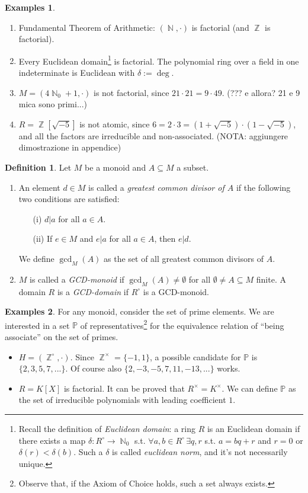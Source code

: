 \documentclass[12pt,a4paper]{report}
\theoremstyle{definition}
\newtheorem{defn}[theorem]{Definition}
\newtheorem*{examples}{Examples}
\theoremstyle{num.custom-title}
\DeclareMathOperator{\N}{\mathbb{N}}
\DeclareMathOperator{\Z}{\mathbb{Z}}
\DeclareMathOperator{\sse}{\subseteq}
\renewcommand{\P}{\mathbb{P}}
\begin{document}
\begin{examples}\ 
\begin{enumerate}
\item Fundamental Theorem of Arithmetic: $(\N,\cdot)$ is factorial (and $\Z$ is factorial).
\item Every Euclidean domain\footnote{Recall the definition of \emph{Euclidean domain}: a ring $R$ is an Euclidean domain if there exists a map $\delta : R^\circ \to \N_0$ s.t. $\forall a,b \in R^\circ \, \exists q,r$ s.t. $a=bq+r$ and $r=0$ or $\delta(r) < \delta(b)$. Such a $\delta$ is called \emph{euclidean norm}, and it's not necessarily unique.} is factorial. The polynomial ring over a field in one indeterminate is Euclidean with $\delta:=\deg$.
\item $M=(4\N_0+1,\cdot)$ is not factorial, since $21 \cdot 21 = 9 \cdot 49$. (??? e allora? 21 e 9 mica sono primi...)
\item $R=\Z[\sqrt{-5}]$ is not atomic, since $6 = 2 \cdot 3 = (1+\sqrt{-5}) \cdot (1-\sqrt{-5})$, and all the factors are irreducible and non-associated. (NOTA: aggiungere dimostrazione in appendice)
\end{enumerate}
\end{examples}

\begin{defn}
Let $M$ be a monoid and $A \sse M$ a subset.
\begin{enumerate}
\item An element $d \in M$ is called a \emph{greatest common divisor of $A$} if the following two conditions are satisfied:
\begin{enumerate}
\item[(i)] $d|a$ for all $a \in A$.
\item[(ii)] If $e \in M$ and $e|a$ for all $a \in A$, then $e|d$.
\end{enumerate}
We define $\gcd_M (A)$ as the set of all greatest common divisors of $A$.
\item $M$ is called a \emph{GCD-monoid} if $\gcd_M (A) \neq \emptyset$ for all $\emptyset \neq A \sse M$ finite. A domain $R$ is a \emph{GCD-domain} if $R^\circ$ is a GCD-monoid.
\end{enumerate}
\end{defn}

\begin{examples}
For any monoid, consider the set of prime elements. We are interested in a set $\P$ of representatives\footnote{Observe that, if the Axiom of Choice holds, such a set always exists.} for the equivalence relation of ``being associate'' on the set of primes.
\begin{itemize}
\item $H=(\Z^\circ,\cdot)$. Since $\Z^\times=\{-1,1\}$, a possible candidate for $\P$ is $\{2,3,5,7,...\}$. Of course also $\{2,-3,-5,7,11,-13,...\}$ works.
\item $R=K[X]$ is factorial. It can be proved that $R^\times=K^\times$. We can define $\P$ as the set of irreducible polynomials with leading coefficient $1$.
\end{itemize}
\end{examples}
\end{document}
